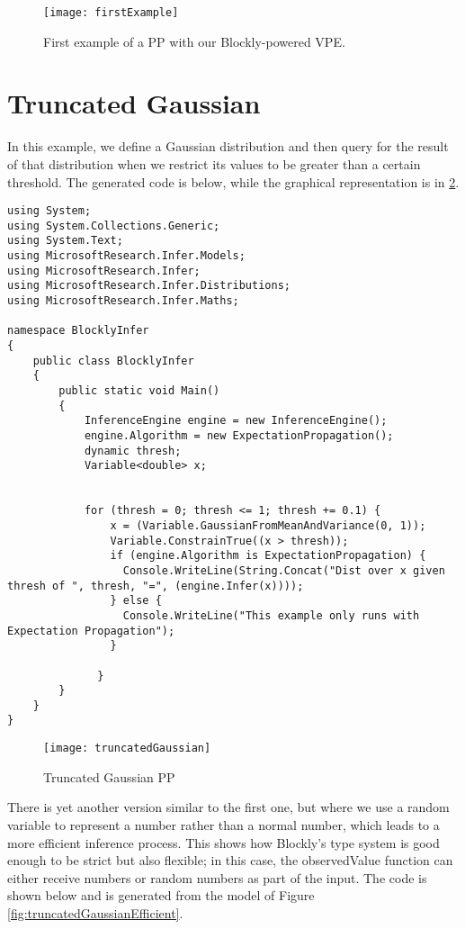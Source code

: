 \begin{figure}[t]
  \begin{center}
    \leavevmode
    \texttt{[image: firstExample]}
    \caption{First example of a PP with our Blockly-powered VPE.}
    \label{fig:firstExample}
  \end{center}
\end{figure}

\section{Truncated Gaussian}

In this example, we define a Gaussian distribution and then query for the
result of that distribution when we restrict its values to be greater than a
certain threshold. The generated code is below, while the graphical representation
is in \ref{fig:truncatedGaussian}.

\begin{lstlisting}
using System;
using System.Collections.Generic;
using System.Text;
using MicrosoftResearch.Infer.Models;
using MicrosoftResearch.Infer;
using MicrosoftResearch.Infer.Distributions;
using MicrosoftResearch.Infer.Maths;

namespace BlocklyInfer
{
	public class BlocklyInfer
	{
		public static void Main()
		{
			InferenceEngine engine = new InferenceEngine();
			engine.Algorithm = new ExpectationPropagation();
			dynamic thresh;
			Variable<double> x;


			for (thresh = 0; thresh <= 1; thresh += 0.1) {
			    x = (Variable.GaussianFromMeanAndVariance(0, 1));
			    Variable.ConstrainTrue((x > thresh));
			    if (engine.Algorithm is ExpectationPropagation) {
			      Console.WriteLine(String.Concat("Dist over x given thresh of ", thresh, "=", (engine.Infer(x))));
			    } else {
			      Console.WriteLine("This example only runs with Expectation Propagation");
			    }

			  }
		}
	}
}
\end{lstlisting}

\begin{figure}[t]
  \begin{center}
    \leavevmode
    \texttt{[image: truncatedGaussian]}
    \caption{Truncated Gaussian PP}
    \label{fig:truncatedGaussian}
  \end{center}
\end{figure}

There is yet another version similar to the first one, but where we use a random
variable to represent a number rather than a normal number, which leads to a more
efficient inference process. This shows how Blockly's type system is good
enough to be strict but also flexible; in this case, the observedValue function
can either receive numbers or random numbers as part of the input. The code is shown
below and is generated from the model of Figure \ref{fig:truncatedGaussianEfficient}.


